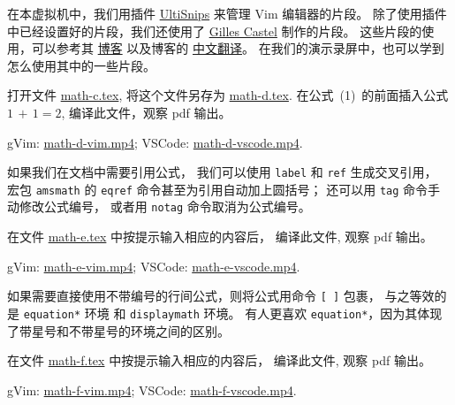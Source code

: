 \documentclass[
    11pt,
    base=hide,
    cite=authoryear,
    device=phone,
    lang=cn,
    mode=simple,
    result=answer,
    toc=onecol,
]{elegantsierxue310}
\begin{document}
在本虚拟机中，我们用插件
\href{https://github.com/SirVer/ultisnips}{UltiSnips}
来管理 Vim 编辑器的片段。
除了使用插件中已经设置好的片段，我们还使用了
\href{https://github.com/gillescastel/latex-snippets}{Gilles Castel}
制作的片段。
这些片段的使用，可以参考其
\href{https://castel.dev/post/lecture-notes-1/}{博客} 以及博客的
\href{https://bonxg.com/p/85.html}{中文翻译}。
在我们的演示录屏中，也可以学到怎么使用其中的一些片段。

\begin{exercise}\label{ex:math-d}
    打开文件
    \href{learn-latex/basic-02/math-c.tex}{math-c.tex},
    将这个文件另存为
    \href{learn-latex/basic-02/math-d.tex}{math-d.tex}.
    在公式~(1)~的前面插入公式 \(1\,+\,1 = 2\),
    编译此文件，观察 pdf 输出。
\end{exercise}
\begin{cast}\label{sol:math-d}
    gVim: \href{media/casts/math-d-vim.mp4}{math-d-vim.mp4};
    VSCode: \href{media/casts/math-d-vscode.mp4}{math-d-vscode.mp4}.
\end{cast}

如果我们在文档中需要引用公式，
我们可以使用 \texttt{label} 和 \texttt{ref} 生成交叉引用，
宏包 \texttt{amsmath} 的 \texttt{eqref} 命令甚至为引用自动加上圆括号；
还可以用 \texttt{tag} 命令手动修改公式编号，
或者用 \texttt{notag} 命令取消为公式编号。

\begin{exercise}\label{ex:math-e}
    在文件 \href{learn-latex/basic-02/math-e.tex}{math-e.tex}
    中按提示输入相应的内容后，
    编译此文件, 观察 pdf 输出。
\end{exercise}
\begin{cast}\label{cast:math-e}
    gVim: \href{media/casts/math-e-vim.mp4}{math-e-vim.mp4};
    VSCode: \href{media/casts/math-e-vscode.mp4}{math-e-vscode.mp4}.
\end{cast}

如果需要直接使用不带编号的行间公式，则将公式用命令 \texttt{[~]} 包裹，
与之等效的是 \texttt{equation*} 环境 和 \texttt{displaymath} 环境。
有人更喜欢 \texttt{equation*}，因为其体现了带星号和不带星号的环境之间的区别。

\begin{exercise}\label{ex:math-f}
    在文件 \href{learn-latex/basic-02/math-f.tex}{math-f.tex}
    中按提示输入相应的内容后，
    编译此文件, 观察 pdf 输出。
\end{exercise}
\begin{cast}\label{cast:math-f}
    gVim: \href{media/casts/math-f-vim.mp4}{math-f-vim.mp4};
    VSCode: \href{media/casts/math-f-vscode.mp4}{math-f-vscode.mp4}.
\end{cast}
\end{document}
